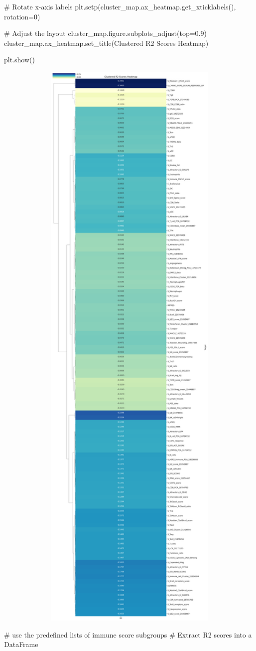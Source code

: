 \documentclass[
  letterpaper,
  DIV=11,
  numbers=noendperiod]{scrartcl}
\newenvironment{Shaded}{\begin{snugshade}}{\end{snugshade}}
\newcommand{\CommentTok}[1]{\textcolor[rgb]{0.37,0.37,0.37}{#1}}
\newcommand{\DecValTok}[1]{\textcolor[rgb]{0.68,0.00,0.00}{#1}}
\newcommand{\FloatTok}[1]{\textcolor[rgb]{0.68,0.00,0.00}{#1}}
\newcommand{\NormalTok}[1]{\textcolor[rgb]{0.00,0.23,0.31}{#1}}
\newcommand{\OperatorTok}[1]{\textcolor[rgb]{0.37,0.37,0.37}{#1}}
\newcommand{\StringTok}[1]{\textcolor[rgb]{0.13,0.47,0.30}{#1}}
\begin{document}
\begin{Shaded}
\begin{Highlighting}[]
\CommentTok{\# Rotate x{-}axis labels}
\NormalTok{plt.setp(cluster\_map.ax\_heatmap.get\_xticklabels(), rotation}\OperatorTok{=}\DecValTok{0}\NormalTok{)}

\CommentTok{\# Adjust the layout}
\NormalTok{cluster\_map.figure.subplots\_adjust(top}\OperatorTok{=}\FloatTok{0.9}\NormalTok{)}
\NormalTok{cluster\_map.ax\_heatmap.set\_title(}\StringTok{\textquotesingle{}Clustered R2 Scores Heatmap\textquotesingle{}}\NormalTok{)}

\NormalTok{plt.show()}
\end{Highlighting}
\end{Shaded}

\includegraphics[width=12.38542in,height=43.17708in]{xgboost_tuned_files/figure-pdf/cell-45-output-1.png}

\begin{Shaded}
\begin{Highlighting}[]
\CommentTok{\# use the predefined lists of immune score subgroups}
\CommentTok{\# Extract R2 scores into a DataFrame}
\Nor
\end{Highlighting}
\end{Shaded}
\end{document}

